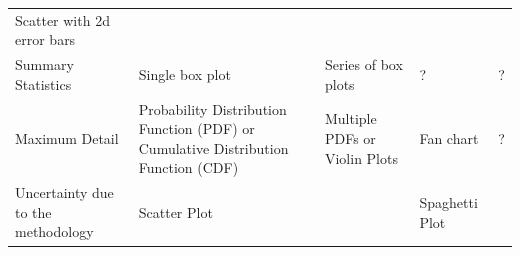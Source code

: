 \documentclass[]{book}
\begin{document}
\begin{longtable}[]{@{}lllll@{}}
\begin{minipage}[t]{0.12\columnwidth}
Scatter with 2d error bars\strut
\end{minipage}\tabularnewline
\begin{minipage}[t]{0.17\columnwidth}\raggedright\strut
Summary Statistics\strut
\end{minipage} & \begin{minipage}[t]{0.33\columnwidth}\raggedright\strut
Single box plot\strut
\end{minipage} & \begin{minipage}[t]{0.14\columnwidth}\raggedright\strut
Series of box plots\strut
\end{minipage} & \begin{minipage}[t]{0.10\columnwidth}\raggedright\strut
?\strut
\end{minipage} & \begin{minipage}[t]{0.12\columnwidth}\raggedright\strut
?\strut
\end{minipage}\tabularnewline
\begin{minipage}[t]{0.17\columnwidth}\raggedright\strut
Maximum Detail\strut
\end{minipage} & \begin{minipage}[t]{0.33\columnwidth}\raggedright\strut
Probability Distribution Function (PDF) or Cumulative Distribution
Function (CDF)\strut
\end{minipage} & \begin{minipage}[t]{0.14\columnwidth}\raggedright\strut
Multiple PDFs or Violin Plots\strut
\end{minipage} & \begin{minipage}[t]{0.10\columnwidth}\raggedright\strut
Fan chart\strut
\end{minipage} & \begin{minipage}[t]{0.12\columnwidth}\raggedright\strut
?\strut
\end{minipage}\tabularnewline
\begin{minipage}[t]{0.17\columnwidth}\raggedright\strut
Uncertainty due to the methodology\strut
\end{minipage} & \begin{minipage}[t]{0.33\columnwidth}\raggedright\strut
Scatter Plot\strut
\end{minipage} & \begin{minipage}[t]{0.14\columnwidth}\raggedright\strut
\strut
\end{minipage} & \begin{minipage}[t]{0.10\columnwidth}\raggedright\strut
Spaghetti Plot\strut
\end{minipage} & \begin{minipage}[t]{0.12\columnwidth}\raggedright\strut

\end{minipage}
\end{longtable}
\end{document}
